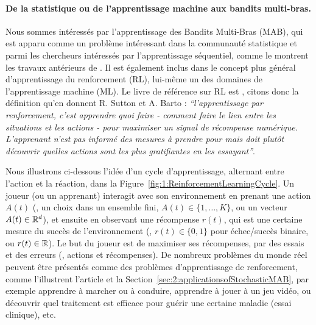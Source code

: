 \begin{resume_fr}
\paragraph{De la statistique ou de l'apprentissage machine aux bandits multi-bras.}
%
Nous sommes intéressés par l'apprentissage des Bandits Multi-Bras (MAB),
qui est apparu comme un problème intéressant dans la communauté statistique et parmi les chercheurs intéressés par l'apprentissage séquentiel, comme le montrent les travaux antérieurs de \cite{Thompson33,Robbins52,LaiRobbins85}.
Il est également inclus dans le concept plus général d'apprentissage du renforcement (RL), lui-même un des domaines de l'apprentissage machine (ML).
%
Le livre de référence sur RL est \cite{SuttonBarto2018}, citons donc la définition qu'en donnent R. Sutton et A. Barto :
\emph{``l'apprentissage par renforcement, c'est apprendre quoi faire - comment faire le lien entre les situations et les actions -
pour maximiser un signal de récompense numérique. L'apprenant n'est pas informé des mesures à prendre pour
mais doit plutôt découvrir quelles actions sont les plus gratifiantes en les essayant''}.


Nous illustrons ci-dessous l'idée d'un cycle d'apprentissage, alternant entre l'action et la réaction,
dans la Figure~\ref{fig:1:ReinforcementLearningCycle}.
Un joueur (ou un apprenant) interagit avec son environnement en prenant une action $A(t)$ (\eg, un choix dans un ensemble fini, $A(t)\in\{1,\dots,K\}$, ou un vecteur $A(t)\in\mathbb{R}^d$), et ensuite en observant une récompense $r(t)$, qui est une certaine mesure du succès de l'environnement (\eg, $r(t)\in\{0,1\}$ pour échec/succès binaire, ou $r(t)\in\mathbb{R}$).
Le but du joueur est de maximiser ses récompenses, par des essais et des erreurs (\ie, actions et récompenses).
De nombreux problèmes du monde réel peuvent être présentés comme des problèmes d'apprentissage de renforcement, comme l'illustrent l'article \cite{bouneffouf2019survey} et la Section~\ref{sec:2:applicationsofStochasticMAB}, par exemple apprendre à marcher ou à conduire, apprendre à jouer à un jeu vidéo, ou découvrir quel traitement est efficace pour guérir une certaine maladie (essai clinique), etc.



\end{resume_fr}
